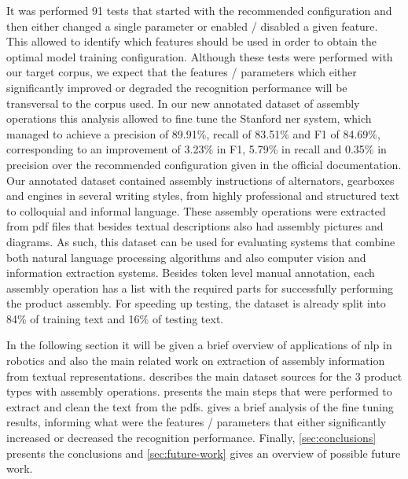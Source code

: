 It was performed 91 tests that started with the recommended configuration and then either changed a single parameter or enabled / disabled a given feature. This allowed to identify which features should be used in order to obtain the optimal model training configuration. Although these tests were performed with our target corpus, we expect that the features / parameters which either significantly improved or degraded the recognition performance will be transversal to the corpus used. In our new annotated dataset of assembly operations this analysis allowed to fine tune the Stanford \gls{ner} system, which managed to achieve a precision of 89.91\%, recall of 83.51\% and F1 of 84.69\%, corresponding to an improvement of 3.23\% in F1, 5.79\% in recall and 0.35\% in precision over the recommended configuration given in the official documentation. Our annotated dataset contained assembly instructions of alternators, gearboxes and engines in several writing styles, from highly professional and structured text to colloquial and informal language. These assembly operations were extracted from \gls{pdf} files that besides textual descriptions also had assembly pictures and diagrams. As such, this dataset can be used for evaluating systems that combine both natural language processing algorithms and also computer vision and information extraction systems. Besides token level manual annotation, each assembly operation has a list with the required parts for successfully performing the product assembly. For speeding up testing, the dataset is already split into 84\% of training text and 16\% of testing text.

In the following section it will be given a brief overview of applications of \gls{nlp} in robotics and also the main related work on extraction of assembly information from textual representations.  describes the main dataset sources for the 3 product types with assembly operations.  presents the main steps that were performed to extract and clean the text from the \glspl{pdf}.  gives a brief analysis of the fine tuning results, informing what were the features / parameters that either significantly increased or decreased the recognition performance. Finally, \cref{sec:conclusions} presents the conclusions and \cref{sec:future-work} gives an overview of possible future work.
